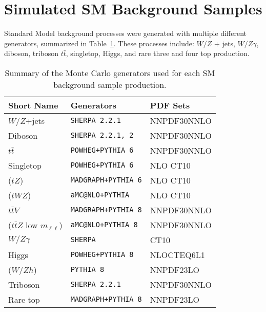  \section{Simulated SM Background Samples}
 \label{sec:simbkg}
 Standard Model background processes were generated with multiple different generators, summarized in Table~\ref{tab:summarySMMC}.  These processes include: $W/Z$ + jets, $W/Z\gamma$, diboson, triboson $t\bar t$, singletop, Higgs, and rare three and four top production.   %
 
 \begin{table}[tbp]
\centering
\begin{tabular}{lll}
\hline
Short Name       & Generators & PDF Sets\\
\hline
\hline
$W/Z$+jets & \texttt{SHERPA 2.2.1} & NNPDF30NNLO\\
\hline
Diboson &   \texttt{SHERPA 2.2.1, 2} & NNPDF30NNLO\\
\hline
$t\bar{t}$ & \texttt{POWHEG+PYTHIA 6} & NNPDF30NNLO\\
\hline
Singletop & \texttt{POWHEG+PYTHIA 6} & NLO CT10\\
 ($tZ$)& \texttt{MADGRAPH+PYTHIA 6} & NLO CT10\\
 ($tWZ$)& \texttt{aMC@NLO+PYTHIA} & NLO CT10\\
\hline 
$t\bar{t}V$ &  \texttt{MADGRAPH+PYTHIA 8} & NNPDF30NNLO\\
($t\bar{t}Z$ low $m_{\ell\ell}$) & \texttt{aMC@NLO+PYTHIA 8} & NNPDF30NNLO\\
\hline
$W/Z\gamma$ & \texttt{SHERPA} & CT10\\
\hline
Higgs &  \texttt{POWHEG+PYTHIA 8} & NLOCTEQ6L1\\
 ($W/Zh$)& \texttt{PYTHIA 8} & NNPDF23LO\\
\hline
Triboson &  \texttt{SHERPA 2.2.1} & NNPDF30NNLO\\
\hline
Rare top &  \texttt{MADGRAPH+PYTHIA 8} & NNPDF23LO\\
\hline
\end{tabular}
\caption{Summary of the Monte Carlo generators used for each SM background sample production.}
\label{tab:summarySMMC}
\end{table}

